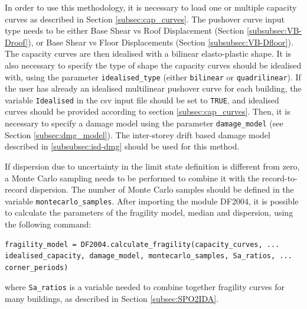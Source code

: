 In order to use this methodology, it is necessary to load one or multiple capacity curves as described in Section \ref{subsec:cap_curves}. The pushover curve input type needs to be either Base Shear vs Roof Displacement (Section \ref{subsubsec:VB-Droof}), or Base Shear vs Floor Displacements (Section \ref{subsubsec:VB-Dfloor}). The capacity curves are then idealised with a bilinear elasto-plastic shape. It is also necessary to specify the type of shape the capacity curves should be idealised with, using the parameter \verb=idealised_type= (either \verb=bilinear= or \verb=quadrilinear=). If the user has already an idealised multilinear pushover curve for each building, the variable \verb=Idealised= in the csv input file should be set to \verb=TRUE=, and idealised curves should be provided according to section \ref{subsec:cap_curves}. Then, it is necessary to specify a damage model using the parameter \verb=damage_model= (see Section \ref{subsec:dmg_model}). The inter-storey drift based damage model described in \ref{subsubsec:isd-dmg} should be used for this method.

If dispersion due to uncertainty in the limit state definition is different from zero, a Monte Carlo sampling needs to be performed to combine it with the record-to-record dispersion. The number of Monte Carlo samples should be defined in the variable \verb=montecarlo_samples=.
After importing the module DF2004, it is possible to calculate the parameters of the fragility model, median and dispersion, using the following command:

\begin{Verbatim}[frame=single, commandchars=\\\{\}, samepage=true]
fragility_model = DF2004.calculate_fragility(capacity_curves, ...
idealised_capacity, damage_model, montecarlo_samples, Sa_ratios, ...
corner_periods)
\end{Verbatim}

where \verb=Sa_ratios= is a variable needed to combine together fragility curves for many buildings, as described in Section \ref{subsec:SPO2IDA}.